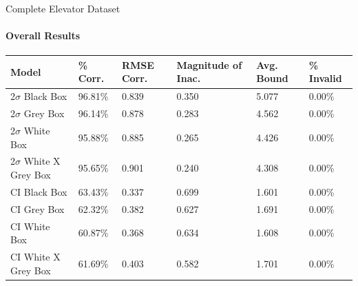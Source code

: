 \documentclass{beamer}
\begin{document}
\begin{frame}[t]{Complete Elevator Dataset}
  \framesubtitle{Overall Results}

  \vspace*{-0.5cm}
  \begin{table}[htp!]
  \small
  \begin{tabular}{|p{2.5cm}|p{1.3cm}|p{1.0cm}|p{1.7cm}|p{1.0cm}|p{1.5cm}|}

      \hline
      \textbf{Model} &
      \textbf{\% Corr.} &
      \textbf{RMSE Corr.} &
      \textbf{Magnitude of Inac.} &
      \textbf{Avg. Bound} &
      \textbf{\% Invalid} \\
      \hline

      2$\sigma$ Black Box &
      96.81\% &
      0.839 &
      0.350 &
      5.077 &
      0.00\% \\
      \hline

      2$\sigma$ Grey Box &
      96.14\% &
      0.878 &
      0.283 &
      4.562 &
      0.00\% \\
      \hline

      2$\sigma$ White Box &
      95.88\% &
      0.885 &
      0.265 &
      4.426 &
      0.00\% \\
      \hline

      2$\sigma$ White X Grey Box &
      95.65\% &
      0.901 &
      0.240 &
      4.308 &
      0.00\% \\
      \hline

      CI Black Box &
      63.43\% &
      0.337 &
      0.699 &
      1.601 &
      0.00\% \\
      \hline

      CI Grey Box &
      62.32\% &
      0.382 &
      0.627 &
      1.691 &
      0.00\% \\
      \hline

      CI White Box &
      60.87\% &
      0.368 &
      0.634 &
      1.608 &
      0.00\% \\
      \hline

      CI White X Grey Box &
      61.69\% &
      0.403 &
      0.582 &
      1.701 &
      0.00\% \\
      \hline


  \end{tabular}
  \end{table}

\end{frame}
\end{document}
